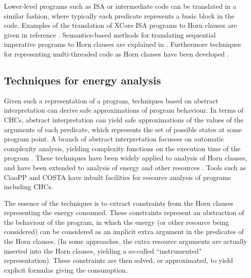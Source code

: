 \documentclass[oneside]{book}
\begin{document}
Lower-level programs such as ISA or intermediate code can be translated
in a similar fashion, where typically each predicate represents a basic block 
in the code. Examples of the translation of XCore ISA programs
to Horn clauses are given in reference \cite{isa-energy-lopstr13-final}.
Semantics-based methods for translating sequential
imperative programs to
Horn clauses are explained in \cite{DBLP:conf/ppdp/AngelisFPP15}.
Furthermore techniques for representing multi-threaded
code as Horn clauses have been developed \cite{ GrebenshchikovLPR12}.


\subsection{Techniques for energy analysis}

Given such a representation of a program, techniques based on abstract interpretation \cite{Cousot1977}
can derive safe approximations of program behaviour.
In terms of CHCs, abstract interpretation can yield
safe approximations of the values of the arguments of each predicate, which represents the
set of possible
states at some program point.
A branch of abstract interpretation 
focusses on automatic complexity analysis, yielding complexity functions on the
execution time of the program \cite{DBLP:journals/cacm/Wegbreit75,Rosendahl89,caslog,resource-iclp07,jvm-cost-esop}.  
These techniques have been widely applied to
analysis of Horn clauses, and have been extended to analysis of energy and
other resources \cite{resource-iclp07,jvm-cost-esop}. Tools such as CiaoPP \cite{ciaopp-sas03-journal-scp} 
and COSTA \cite{AlbertAGPZ08b} have inbuilt
facilities for resource analysis of programs including CHCs.

The essence of the techniques is to extract constraints from the Horn clauses
representing the energy consumed. These constraints represent an abstraction of the behaviour
of the program, in which the energy (or other resource being considered)
can be considered as an implicit extra argument in the predicates of the Horn clauses.
(In some approaches, the extra resource arguments are actually inserted into
the Horn clauses, yielding a so-called ``instrumented" representation).
These constraints are then solved, or approximated, to yield explicit 
formulas giving the consumption.


 
\end{document}
